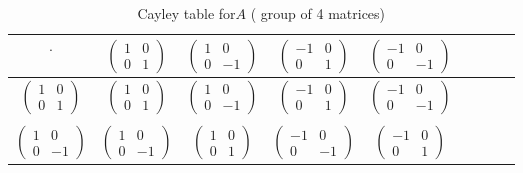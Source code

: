 \begin{table}[H]
\caption{Cayley table for$A$ ( group of 4 matrices)}
{\small
\begin{center}
\begin{tabular}{c|cccccccc}
$\cdot$ & $\begin{pmatrix}1 & 0 \\ 0 & 1 \end{pmatrix}$ 
& $\begin{pmatrix}1 & 0 \\0 & -1\end{pmatrix}$ 
& $\begin{pmatrix}-1 & 0 \\0 & 1\end{pmatrix}$ 
& $\begin{pmatrix}-1 & 0 \\0 & -1\end{pmatrix}$  \\
\hline
$\begin{pmatrix}1 & 0 \\ 0 & 1 \end{pmatrix}$ 
& $\begin{pmatrix}1 & 0 \\ 0 & 1 \end{pmatrix}$ 
& $\begin{pmatrix}1 & 0 \\0 & -1\end{pmatrix}$ 
& $\begin{pmatrix}-1 & 0 \\0 & 1\end{pmatrix}$
& $\begin{pmatrix}-1 & 0 \\0 & -1\end{pmatrix}$\\
\\
$\begin{pmatrix}1 & 0 \\0 & -1\end{pmatrix}$       
& $\begin{pmatrix}1 & 0 \\0 & -1\end{pmatrix}$ 
& $\begin{pmatrix}1 & 0 \\ 0 & 1 \end{pmatrix}$ 
& $\begin{pmatrix}-1 & 0 \\0 & -1\end{pmatrix}$ 
& $\begin{pmatrix}-1 & 0 \\0 & 1\end{pmatrix}$ \\

\end{tabular}
\end{center}}
\end{table}
